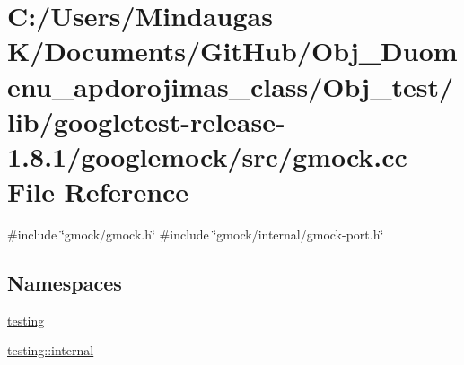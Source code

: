 \hypertarget{_obj__test_2lib_2googletest-release-1_88_81_2googlemock_2src_2gmock_8cc}{}\section{C\+:/\+Users/\+Mindaugas K/\+Documents/\+Git\+Hub/\+Obj\+\_\+\+Duomenu\+\_\+apdorojimas\+\_\+class/\+Obj\+\_\+test/lib/googletest-\/release-\/1.8.1/googlemock/src/gmock.cc File Reference}
\label{_obj__test_2lib_2googletest-release-1_88_81_2googlemock_2src_2gmock_8cc}
{\ttfamily \#include \char`\"{}gmock/gmock.\+h\char`\"{}}\newline
{\ttfamily \#include \char`\"{}gmock/internal/gmock-\/port.\+h\char`\"{}}\newline
\subsection*{Namespaces}
\begin{DoxyCompactItemize}
\item 
 \mbox{\hyperlink{namespacetesting}{testing}}
\item 
 \mbox{\hyperlink{namespacetesting_1_1internal}{testing\+::internal}}
\end{DoxyCompactItemize}
